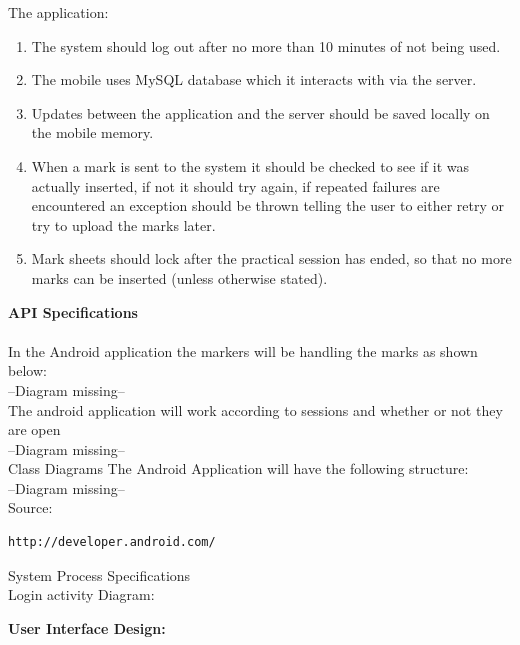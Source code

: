 \documentclass[12pt,a4paper]{article}
\begin{document}
 

 The application:

\begin{enumerate}
\item  The system should log out after no more than 10 minutes of not being used. 

\item  The mobile uses MySQL database which it interacts with via the server. 

\item  Updates between the application and the server should be saved locally on the mobile memory.

\item  When a mark is sent to the system it should be checked to see if it was actually inserted, if not it should try again, if repeated failures are encountered an exception should be thrown telling the user to either retry or try to upload the marks later. 

\item  Mark sheets should lock after the practical session has ended, so that no more marks can be inserted (unless otherwise stated). 
\end{enumerate}

\noindent \textbf{API Specifications}\\\\
In the Android application the markers will be handling the marks as shown below:
 \\--Diagram missing--\\

The android application will work according to sessions and whether or not they are open
\\--Diagram missing--\\

Class Diagrams
The Android Application will have the following structure: 
\\--Diagram missing--\\

Source:
\begin{verbatim}
http://developer.android.com/
\end{verbatim}

System Process Specifications\\
Login activity Diagram:


\textbf{User Interface Design:}
\end{document}
